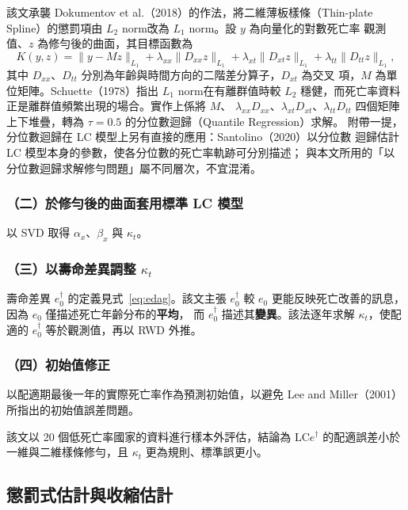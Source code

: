 \documentclass[UTF8, fontset=macnew, a4paper, 12pt]{ctexart}
\newcommand{\edag}{e_0^{\dagger}}
\newcommand{\LCe}{\mathrm{LC}e^{\dagger}}
\begin{document}
該文承襲 Dokumentov et al.（2018）的作法，將二維薄板樣條（Thin-plate
Spline）的懲罰項由 $L_2$ norm改為 $L_1$ norm。設 $y$ 為向量化的對數死亡率
觀測值、$z$ 為修勻後的曲面，其目標函數為
\begin{equation}
K(y,z)=\|y-Mz\|_{L_1}+\lambda_{xx}\|D_{xx}z\|_{L_1}
+\lambda_{xt}\|D_{xt}z\|_{L_1}+\lambda_{tt}\|D_{tt}z\|_{L_1},
\end{equation}
其中 $D_{xx}$、$D_{tt}$ 分別為年齡與時間方向的二階差分算子，$D_{xt}$ 為交叉
項，$M$ 為單位矩陣。Schuette（1978）指出 $L_1$ norm在有離群值時較 $L_2$
穩健，而死亡率資料正是離群值頻繁出現的場合。實作上係將 $M$、
$\lambda_{xx}D_{xx}$、$\lambda_{xt}D_{xt}$、$\lambda_{tt}D_{tt}$ 四個矩陣
上下堆疊，轉為 $\tau=0.5$ 的分位數迴歸（Quantile Regression）求解。
附帶一提，分位數迴歸在 LC 模型上另有直接的應用：Santolino（2020）以分位數
迴歸估計 LC 模型本身的參數，使各分位數的死亡率軌跡可分別描述；
與本文所用的「以分位數迴歸求解修勻問題」屬不同層次，不宜混淆。

\subsubsection{（二）於修勻後的曲面套用標準 LC 模型}

以 SVD 取得 $\alpha_x$、$\beta_x$ 與 $\kappa_t$。

\subsubsection{（三）以壽命差異調整 $\kappa_t$}

壽命差異 $\edag$ 的定義見式~\eqref{eq:edag}。該文主張 $\edag$ 較 $e_0$
更能反映死亡改善的訊息，因為 $e_0$ 僅描述死亡年齡分布的\textbf{平均}，
而 $\edag$ 描述其\textbf{變異}。該法逐年求解 $\kappa_t$，使配適的 $\edag$
等於觀測值，再以 RWD 外推。

\subsubsection{（四）初始值修正}

以配適期最後一年的實際死亡率作為預測初始值，以避免 Lee and Miller（2001）
所指出的初始值誤差問題。

該文以 20 個低死亡率國家的資料進行樣本外評估，結論為 $\LCe$ 的配適誤差小於
一維與二維樣條修勻，且 $\kappa_t$ 更為規則、標準誤更小。

\subsection{懲罰式估計與收縮估計}
\end{document}
